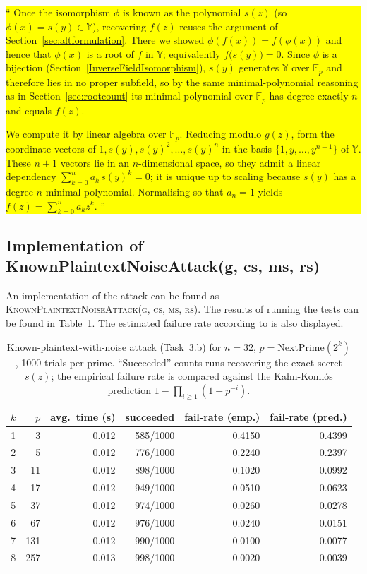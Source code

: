 \documentclass{article}
\newcommand{\aitext}[1]{%
  \colorbox{yellow}{\parbox{\dimexpr\linewidth-2\fboxsep\relax}{``#1''}}}
\begin{document}
\aitext{
Once the isomorphism $\phi$ is known as the polynomial $s(z)$ (so
$\phi(x) = s(y) \in \mathbb{Y}$), recovering $f(z)$ reuses the argument of Section~\ref{sec:altformulation}. There we showed $\phi(f(x)) = f(\phi(x))$ and hence that $\phi(x)$ is a root of $f$ in $\mathbb{Y}$; equivalently $f\bigl(s(y)\bigr) = 0$. Since $\phi$ is a bijection (Section~\ref{InverseFieldIsomorphism}), $s(y)$ generates $\mathbb{Y}$ over $\mathbb{F}_p$ and therefore lies in no proper subfield, so by the same minimal-polynomial reasoning as in Section~\ref{sec:rootcount} its minimal polynomial over $\mathbb{F}_p$ has degree exactly $n$ and equals $f(z)$.

We compute it by linear algebra over $\mathbb{F}_p$. Reducing modulo $g(z)$, form the coordinate vectors of $1, s(y), s(y)^2, \dots, s(y)^n$ in the basis $\{1, y, \dots, y^{n-1}\}$ of $\mathbb{Y}$. These $n+1$ vectors lie in an $n$-dimensional space, so they admit a linear dependency $\sum_{k=0}^{n} a_k\, s(y)^k = 0$; it is unique up to scaling because $s(y)$ has a degree-$n$ minimal polynomial. Normalising so that $a_n = 1$ yields $f(z) = \sum_{k=0}^{n} a_k z^k$.
}

\subsection{Implementation of KnownPlaintextNoiseAttack(g, cs, ms, rs)}
\label{ImplKnownPlaintextNoiseAttack}
An implementation of the attack can be found as \textsc{KnownPlaintextNoiseAttack(g, cs, ms, rs)}. The results of running the tests can be found in Table~\ref{tab:kpn}. The estimated failure rate according to \textcite{kahn-2001} is also displayed.
\begin{table}[h]
\centering
\begin{tabular}{r|r|r|r|r|r}
\hline
$k$ & $p$ & avg.\ time (s) & succeeded & fail-rate (emp.) & fail-rate (pred.) \\
\hline
1 & 3   & 0.012 & 585/1000 & 0.4150 & 0.4399 \\
2 & 5   & 0.012 & 776/1000 & 0.2240 & 0.2397 \\
3 & 11  & 0.012 & 898/1000 & 0.1020 & 0.0992 \\
4 & 17  & 0.012 & 949/1000 & 0.0510 & 0.0623 \\
5 & 37  & 0.012 & 974/1000 & 0.0260 & 0.0278 \\
6 & 67  & 0.012 & 976/1000 & 0.0240 & 0.0151 \\
7 & 131 & 0.012 & 990/1000 & 0.0100 & 0.0077 \\
8 & 257 & 0.013 & 998/1000 & 0.0020 & 0.0039 \\
\hline
\end{tabular}
\caption{Known-plaintext-with-noise attack (Task~3.b) for $n=32$, $p=\mathrm{NextPrime}(2^k)$, 1000 trials per prime. ``Succeeded'' counts runs recovering the exact secret $s(z)$; the empirical failure rate is compared against the Kahn-Komlós prediction $1-\prod_{i\ge1}(1-p^{-i})$.}
\label{tab:kpn}
\end{table}
\end{document}
